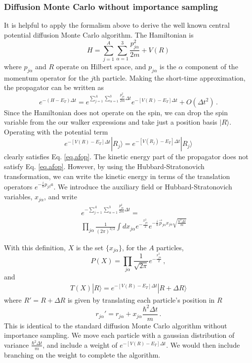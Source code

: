 \subsubsection{Diffusion Monte Carlo without importance sampling}
 It is helpful to apply the formalism above to derive
 the well known central potential
 diffusion Monte Carlo algorithm\cite{anderson1976}.
 The Hamiltonian is
 \begin{equation}
 H = \sum_{j=1}^A \sum_{\alpha=1}^3 \frac{p_{j\alpha}^2}{2m} + V(R)
 \end{equation}
 where $p_{j\alpha}$ and $R$ operate on Hilbert space, and $p_{j\alpha}$
 is the $\alpha$ component of the momentum operator for the $j$th
 particle.
 Making the short-time approximation, the propagator can be written
 as
 \begin{equation}
 e^{-(H-E_T)\Delta t} = e^{\sum_{j=1}^A\sum_{\alpha=1}^3
 	\frac{p_{j\alpha}^2}{2m} \Delta t}
 e^{-[V(R)-E_T]\Delta t} + O(\Delta t^2) \,.
 \end{equation}
 Since the Hamiltonian does not operate on the spin, we can drop the
 spin variable
 from the our walker expressions and take just a position basis $|R\rangle$.
 Operating with the potential term
 \begin{equation}
 e^{-[V(R)-E_T]\Delta t}|R_j\rangle = 
 e^{-[V(R_j)-E_T]\Delta t}|R_j\rangle
 \end{equation}
 clearly satisfies Eq. \ref{eq.afop}. The kinetic energy part of the
 propagator does not satisfy Eq. \ref{eq.afop}. However, by
 using the Hubbard-Stratonovich transformation,
 we can write the kinetic energy in terms of the translation operators
 $e^{-\frac{i}{\hbar} p_{j\beta} a}$.
 We introduce the auxiliary field or Hubbard-Stratonovich variables,
 $x_{j\alpha}$, and write
 \begin{eqnarray}
 &&
 e^{-\sum_{j=1}^A\sum_{\alpha=1}^3 \frac{p_{j\alpha}^2}{2m} \Delta t} = 
 \nonumber\\
 &&
 \prod_{j\alpha} \frac{1}{(2\pi)^{3/2}} \int d x_{j\alpha}
 e^{-\frac{x_{j\alpha}^2}{2}}
 e^{-\frac{i}{\hbar} \vec p_{j\alpha}
 	x_{j\alpha} \sqrt{\frac{\hbar^2 \Delta t}{m}}}
 \end{eqnarray}
 
 With this definition, $X$ is the set $\{x_{j\alpha}\}$,
 for the $A$ particles,
 \begin{equation}
 P(X) =
 \prod_{j\alpha} \frac{1}{\sqrt{2\pi}} e^{-\frac{x_{j\alpha}^2}{2}} \,,
 \end{equation}
 and
 \begin{eqnarray}
 T(X)|R\rangle =
 e^{-[V(R)-E_T]\Delta t} |R+\Delta R\rangle
 \end{eqnarray}
 where $R' = R+\Delta R$ is given by translating each particle's position in $R$
 \begin{equation}
 r_{j\alpha}' = r_{j\alpha} + x_{j\alpha} \frac{\hbar^2 \Delta t}{m} \,.
 \end{equation}
 This is identical to the standard diffusion Monte Carlo algorithm without
 importance sampling. We move
 each particle with a gaussian distribution of variance
 $\frac{\hbar^2 \Delta t}{m}$, and include a weight of
 $e^{-[V(R)-E_T]\Delta t}$. We would then include branching on the weight
 to complete the algorithm.
 

